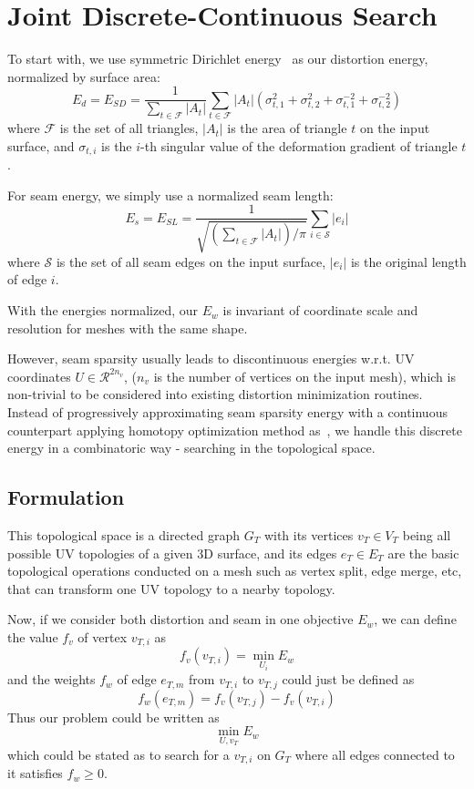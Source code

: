 
\section{Joint Discrete-Continuous Search}

To start with, we use symmetric Dirichlet energy~\cite{Smith2015Bijective} as our distortion energy, normalized by surface area:
\[ E_d = E_{SD} = \frac{1}{\sum_{t\in\mathcal{F}} |A_t|} \sum_{t\in\mathcal{F}} |A_t|(\sigma_{t,1}^2 + \sigma_{t,2}^2 + \sigma_{t,1}^{-2} + \sigma_{t,2}^{-2}) \]
where $\mathcal{F}$ is the set of all triangles, $|A_t|$ is the area of triangle $t$ on the input surface, and $\sigma_{t,i}$ is the $i$-th singular value of the deformation gradient of triangle $t$.

For seam energy, we simply use a normalized seam length:
\[ E_s = E_{SL} = \frac{1}{\sqrt{(\sum_{t\in\mathcal{F}} |A_t|)/\pi}} \sum_{i \in \mathcal{S}} |e_i| \]
where $\mathcal{S}$ is the set of all seam edges on the input surface, $|e_i|$ is the original length of edge $i$.

With the energies normalized, our $E_w$ is invariant of coordinate scale and resolution for meshes with the same shape.

However, seam sparsity usually leads to discontinuous energies w.r.t. UV coordinates $U \in \mathcal{R}^{2n_v}$, ($n_v$ is the number of vertices on the input mesh), which is non-trivial to be considered into existing distortion minimization routines. Instead of progressively approximating seam sparsity energy with a continuous counterpart applying homotopy optimization method as~\cite{Poranne2017Autocuts}, we handle this discrete energy in a combinatoric way - searching in the topological space.

\subsection{Formulation}

This topological space is a directed graph $G_T$ with its vertices $v_T \in V_T$ being all possible UV topologies of a given 3D surface, and its edges $e_T \in E_T$ are the basic topological operations conducted on a mesh such as vertex split, edge merge, etc, that can transform one UV topology to a nearby topology.

Now, if we consider both distortion and seam in one objective $E_w$, we can define the value $f_v$ of vertex $v_{T,i}$ as 
\[ f_v(v_{T,i}) = \min_{U_i} E_w \]
and the weights $f_w$ of edge $e_{T,m}$ from $v_{T,i}$ to $v_{T,j}$ could just be defined as 
\[ f_w(e_{T,m}) = f_v(v_{T,j}) - f_v(v_{T,i}) \]
Thus our problem could be written as
\[ \min_{U, v_T} E_w \]
which could be stated as to search for a $v_{T,i}$ on $G_T$ where all edges connected to it satisfies $f_w \geq 0$. 

